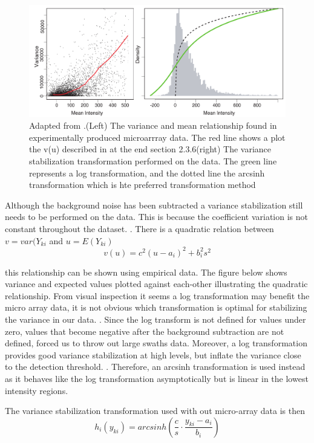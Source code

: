 \documentclass[a4paper,11pt,twoside]{book}
\begin{document}
	\begin{figure}[ht]
		\includegraphics[width=1.2\linewidth]{3.Trancriptomics/Variance_stablizaiton.pdf}
		\caption{Adapted from  \citep{Durbin2002}.(Left) The variance and mean relationship found in experimentally produced microarrray data. The red line shows a plot the v(u) described in at the end section 2.3.6(right) The variance stabilization transformation performed on the data. The green line represents a log transformation, and the dotted line the arcsinh transformation which is hte preferred transformation method   }
	\end{figure}
	
	Although the background noise has been subtracted a variance stabilization still needs to be performed on the data. This is because the coefficient variation is not constant throughout the dataset.  \citep{Durbin2002}. There is a quadratic relation between 
	$v = var(Y_{ki}$ and $u = E(Y_{ki})$
	$$v(u) = c^2(u-a_i)^2 + b_i^2s^2$$
	
	this relationship can be shown using empirical data. The figure below shows variance and expected values plotted against each-other illustrating the quadratic relationship. From visual inspection it seems a log transformation may benefit the micro array data, it is not obvious which transformation is optimal for stabilizing the variance in our data. \citep{Durbin2002}.  Since the log transform is not defined for values under zero, values that become negative after the background subtraction are not defined, forced us to throw out large swaths data. Moreover, a log transformation provides good variance stabilization at high levels, but inflate the variance close to the detection threshold. \citep{Durbin2002}.  Therefore, an arcsinh transformation is used instead as it behaves like the log transformation asymptotically but is linear in the lowest intensity regions.
	

	
	The variance stabilization transformation used with out micro-array data is then
	$$h_i(y_{ki}) = arcsinh(\dfrac{c}{s}{\cdot}\dfrac{y_{ki} - a_i}{b_i}) $$
	
\end{document}
